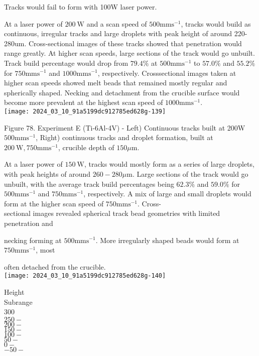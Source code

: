 \documentclass[10pt]{article}
\begin{document}
Tracks would fail to form with 100W laser power.

At a laser power of $200 \mathrm{~W}$ and a scan speed of $500 \mathrm{mms}^{-1}$, tracks would build as continuous, irregular tracks and large droplets with peak height of around 220-280um. Cross-sectional images of these tracks showed that penetration would range greatly. At higher scan speeds, large sections of the track would go unbuilt. Track build percentage would drop from $79.4 \%$ at $500 \mathrm{mms}^{-1}$ to $57.0 \%$ and $55.2 \%$ for $750 \mathrm{mms}^{-1}$ and $1000 \mathrm{mms}^{-1}$, respectively. Crosssectional images taken at higher scan speeds showed melt beads that remained mostly regular and spherically shaped. Necking and detachment from the crucible surface would become more prevalent at the highest scan speed of $1000 \mathrm{mms}^{-1}$.\\
\texttt{[image: 2024\_03\_10\_91a5199dc912785ed628g-139]}

Figure 78. Experiment E (Ti-6Al-4V) - Left) Continuous tracks built at 200W $500 \mathrm{mms}^{-1}$, Right) continuous tracks and droplet formation, built at $200 \mathrm{~W}, 750 \mathrm{mms}^{-1}$, crucible depth of $150 \mu \mathrm{m}$.

At a laser power of $150 \mathrm{~W}$, tracks would mostly form as a series of large droplets, with peak heights of around $260-280 \mu \mathrm{m}$. Large sections of the track would go unbuilt, with the average track build percentages being $62.3 \%$ and $59.0 \%$ for $500 \mathrm{mms}^{-1}$ and $750 \mathrm{mms}^{-1}$, respectively. A mix of large and small droplets would form at the higher scan speed of $750 \mathrm{mms}^{-1}$. Cross-\\
sectional images revealed spherical track bead geometries with limited penetration and

necking forming at $500 \mathrm{mms}^{-1}$. More irregularly shaped beads would form at $750 \mathrm{mms}^{-1}$, most

often detached from the crucible.\\
\texttt{[image: 2024\_03\_10\_91a5199dc912785ed628g-140]}

Height\\
Subrange\\
300\\
$250-$\\
$200-$\\
$150-$\\
$100-$\\
$50-$\\
$0-$\\
$-50-$
\end{document}

